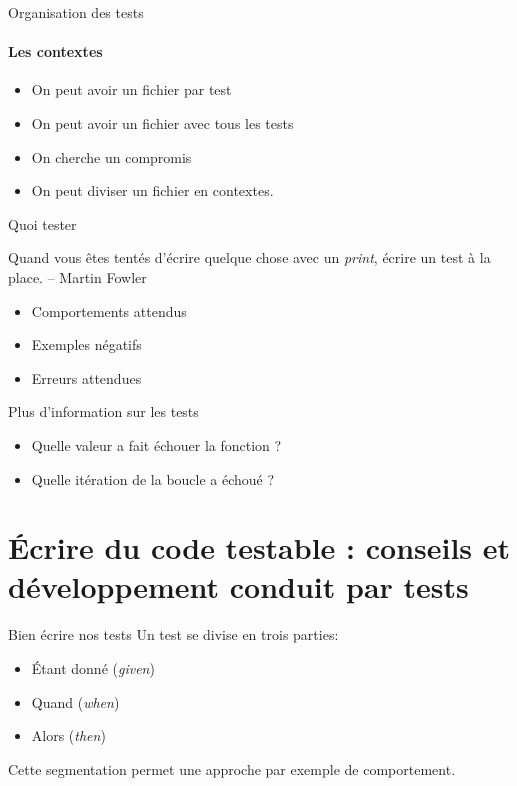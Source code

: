 \documentclass[11pt]{beamer}
\begin{document}
\begin{frame}{Organisation des tests}
\framesubtitle{Les contextes}
\begin{itemize}
\item On peut avoir un fichier par test
\item On peut avoir un fichier avec tous les tests
\item On cherche un compromis
\item On peut diviser un fichier en contextes.
\end{itemize}
\end{frame}

\begin{frame}{Quoi tester}
\begin{block}{}
Quand vous êtes tentés d'écrire quelque chose avec un \textit{print}, écrire un test à la place. -- Martin Fowler
\end{block}
\begin{itemize}
\item Comportements attendus
\item Exemples négatifs
\item Erreurs attendues
\end{itemize}
\end{frame}

\begin{frame}{Plus d'information sur les tests}
\begin{itemize}
\item Quelle valeur a fait échouer la fonction ?
\item Quelle itération de la boucle a échoué ?
\end{itemize}
\end{frame}

\section[Écrire du code testable : conseils et développement conduit par tests]{Écrire du code testable : conseils et développement conduit par tests}

\begin{frame}{Bien écrire nos tests}
Un test se divise en trois parties:
\begin{itemize}
	\item Étant donné (\textit{given})
	\item Quand (\textit{when})
	\item Alors (\textit{then})
\end{itemize}
Cette segmentation permet une approche par exemple de comportement.

\end{frame}
\end{document}
